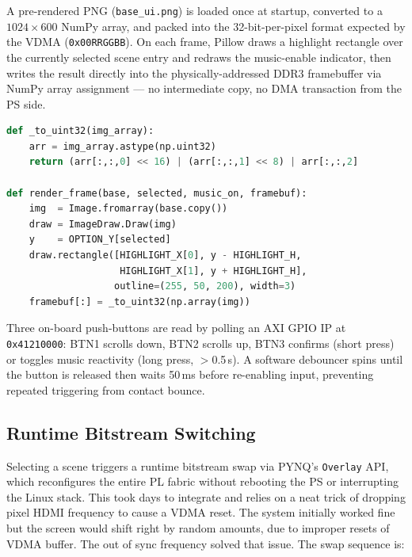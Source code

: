 A pre-rendered PNG (\texttt{base\_ui.png}) is loaded once at startup,
converted to a $1024\times600$ NumPy array, and packed into the 32-bit-per-pixel
format expected by the VDMA (\texttt{0x00RRGGBB}). On each frame, Pillow
draws a highlight rectangle over the currently selected scene entry and
redraws the music-enable indicator, then writes the result directly into the
physically-addressed DDR3 framebuffer via NumPy array assignment --- no
intermediate copy, no DMA transaction from the PS side.

\begin{lstlisting}[language=Python]
def _to_uint32(img_array):
    arr = img_array.astype(np.uint32)
    return (arr[:,:,0] << 16) | (arr[:,:,1] << 8) | arr[:,:,2]

def render_frame(base, selected, music_on, framebuf):
    img  = Image.fromarray(base.copy())
    draw = ImageDraw.Draw(img)
    y    = OPTION_Y[selected]
    draw.rectangle([HIGHLIGHT_X[0], y - HIGHLIGHT_H,
                    HIGHLIGHT_X[1], y + HIGHLIGHT_H],
                   outline=(255, 50, 200), width=3)
    framebuf[:] = _to_uint32(np.array(img))
\end{lstlisting}

Three on-board push-buttons are read by polling an AXI GPIO IP at
\texttt{0x41210000}: BTN1 scrolls down, BTN2 scrolls up, BTN3 confirms
(short press) or toggles music reactivity (long press, $>$0.5\,s). A
software debouncer spins until the button is released then waits 50\,ms
before re-enabling input, preventing repeated triggering from contact bounce.

\subsection{Runtime Bitstream Switching}

Selecting a scene triggers a runtime bitstream swap via PYNQ's
\texttt{Overlay} API, which reconfigures the entire PL fabric without
rebooting the PS or interrupting the Linux stack. This took days to integrate and relies on a neat trick of dropping pixel HDMI frequency to cause a VDMA reset. The system initially worked fine but the screen would shift right by random amounts, due to improper resets of VDMA buffer. The out of sync frequency solved that issue. The swap sequence is:

